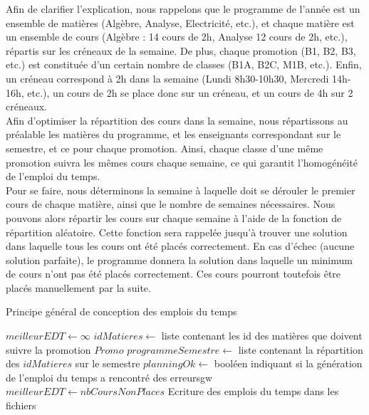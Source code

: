 \documentclass[12pt,a4paper,french]{article}
\begin{document}
Afin de clarifier l'explication, nous rappelons que le programme de l'année est un ensemble de matières (Algèbre, Analyse, Electricité, etc.), et chaque matière est un ensemble de cours (Algèbre : 14 cours de 2h, Analyse 12 cours de 2h, etc.), répartis sur les créneaux de la semaine. De plus, chaque promotion (B1, B2, B3, etc.) est constituée d'un certain nombre de classes (B1A, B2C, M1B, etc.).
Enfin, un créneau correspond à 2h dans la semaine (Lundi 8h30-10h30, Mercredi 14h-16h, etc.), un cours de 2h se place donc sur un créneau, et un cours de 4h sur 2 créneaux.\\

Afin d'optimiser la répartition des cours dans la semaine, nous répartissons au préalable les matières du programme, et les enseignants correspondant sur le semestre, et ce pour chaque promotion. Ainsi, chaque classe d'une même promotion suivra les mêmes cours chaque semaine, ce qui garantit l'homogénéité de l'emploi du temps.\\

Pour se faire, nous déterminons la semaine à laquelle doit se dérouler le premier cours de chaque matière, ainsi que le nombre de semaines nécessaires. Nous pouvons alors répartir les cours sur chaque semaine à l'aide de la fonction de répartition aléatoire. Cette fonction sera rappelée jusqu'à trouver une solution dans laquelle tous les cours ont été placés correctement. En cas d'échec (aucune solution parfaite), le programme donnera la solution dans laquelle un minimum de cours n'ont pas été placés correctement. Ces cours pourront toutefois être placés manuellement par la suite.\\

\begin{algorithm}
\caption{Principe général de conception des emplois du temps}
\begin{algorithmic}
\STATE $meilleurEDT \leftarrow \infty$
\REPEAT
{}
\STATE $idMatieres \leftarrow$ liste contenant les id des matières que doivent suivre la promotion $Promo$
\STATE $programmeSemestre \leftarrow $ liste contenant la répartition des $idMatieres$ sur le semestre
\STATE $planningOk \leftarrow$ booléen indiquant si la génération de l'emploi du temps a rencontré des erreursgw
\ENDFOR
{}
\STATE $meilleurEDT \leftarrow nbCoursNonPlaces$
\STATE Ecriture des emplois du temps dans les fichiers
\ENDIF
\ENDIF
{}
\end{algorithmic}
\end{algorithm}
\end{document}
